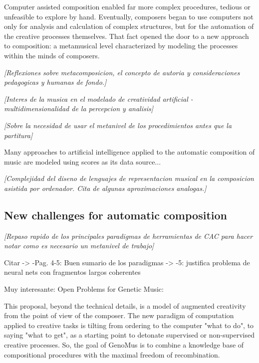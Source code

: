 \documentclass{article}
\begin{document}
Computer assisted composition enabled
far more complex procedures, tedious or unfeasible to explore by hand. Eventually, composers began to use computers not only for analysis and calculation of complex structures, but for the automation of the creative processes themselves. That fact opened the door to a new approach to composition: a metamusical level characterized by modeling the processes within the minds of composers. 

{\color{gray} \textsl{[Reflexiones sobre metacomposicion, el concepto de autoria y consideraciones pedagogicas y humanas de fondo.]}}


{\color{gray} \textsl{[Interes de la musica en el modelado de creatividad artificial - multidimensionalidad de la percepcion y analisis]}}

{\color{gray} \textsl{[Sobre la necesidad de usar el metanivel de los procedimientos antes que la partitura]}}

Many approaches to artificial intelligence applied to the automatic composition of music are modeled using scores as its data source...

{\color{gray} \textsl{[Complejidad del diseno de lenguajes de representacion musical en la composicion asistida por ordenador. Cita de algunas aproximaciones analogas.]}}

\subsection{New challenges for automatic composition}




{\color{gray} \textsl{[Repaso rapido de los principales paradigmas de herramientas de CAC para hacer notar como es necesario un metanivel de trabajo]}}

{\color{red}
Citar \cite{Nierhaus:2008:ACP:1524239}
	-> -Pag. 4-5: Buen sumario de los paradigmas
	-> -5: justifica problema de neural nets con fragmentos largos coherentes 

Muy interesante: Open Problems for Genetic Music: \cite{DBLP:conf/evoW/McCormack05}
}

This proposal, beyond the technical details, is a model of augmented creativity from the point of view of the composer. The new paradigm of computation applied to creative tasks is tilting from ordering to the computer "what to do", to saying "what to get", as a starting point to detonate supervised or non-supervised creative processes. So, the goal of GenoMus is to combine a knowledge base of compositional procedures with the maximal freedom of recombination. 
\end{document}
